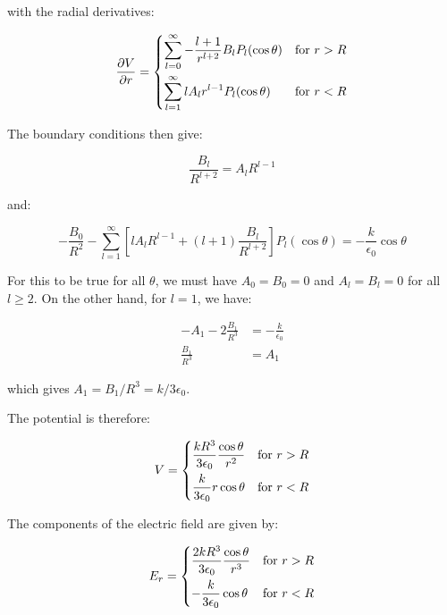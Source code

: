\documentclass[12pt]{article}
\begin{document}
with the radial derivatives:

\begin{equation}
\frac{\partial V}{\partial r} =
\begin{dcases}
    \sum_{l=0}^{\infty} -\frac{l+1}{r^{l+2}} B_{l} P_{l}(\cos{\theta}) & \text{for } r > R \\
    \sum_{l=1}^{\infty} l A_{l} r^{l-1} P_{l}(\cos{\theta}) & \text{for } r < R
\end{dcases}
\end{equation}

The boundary conditions then give:

\begin{equation}
\frac{B_{l}}{R^{l+2}} = A_{l} R^{l-1}
\end{equation}

and:

\begin{equation}
-\frac{B_{0}}{R^{2}} - \sum_{l=1}^{\infty} \left[ l A_{l} R^{l-1} + (l + 1)\frac{B_{l}}{R^{l+2}} \right] P_{l}(\cos{\theta}) = -\frac{k}{\epsilon_{0}} \cos{\theta}
\end{equation}

For this to be true for all $\theta$, we must have $A_{0} = B_{0} = 0$ and $A_{l} = B_{l} = 0$ for all $l \ge 2$. On the other hand, for $l = 1$, we have:

\begin{equation}
\begin{split}
    -A_{1} - 2\frac{B_{1}}{R^{3}} &= -\frac{k}{\epsilon_{0}} \\
    \frac{B_{1}}{R^{3}} &= A_{1}
\end{split}
\end{equation}

which gives $A_{1} = B_{1}/R^{3} = k/3\epsilon_{0}$.

The potential is therefore:

\begin{equation}
V =
\begin{dcases}
    \frac{kR^{3}}{3\epsilon_{0}} \frac{\cos{\theta}}{r^{2}} & \text{for } r > R \\
    \frac{k}{3\epsilon_{0}} r \cos{\theta} & \text{for } r < R
\end{dcases}
\end{equation}

The components of the electric field are given by:

\begin{equation}
E_{r} = 
\begin{dcases}
    \frac{2kR^{3}}{3\epsilon_{0}} \frac{\cos{\theta}}{r^{3}} & \text{for } r > R \\
    -\frac{k}{3\epsilon_{0}} \cos{\theta} & \text{for } r < R
\end{dcases}
\end{equation}
\end{document}

